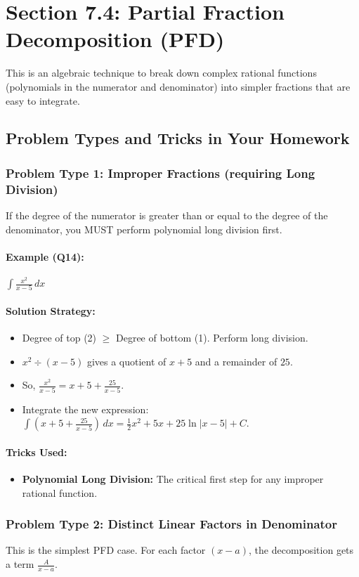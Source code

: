 \documentclass{article}
\begin{document}
\section{Section 7.4: Partial Fraction Decomposition (PFD)}
This is an algebraic technique to break down complex rational functions (polynomials in the numerator and denominator) into simpler fractions that are easy to integrate.

\subsection{Problem Types and Tricks in Your Homework}
\subsubsection{Problem Type 1: Improper Fractions (requiring Long Division)}
If the degree of the numerator is greater than or equal to the degree of the denominator, you MUST perform polynomial long division first.
\paragraph{Example (Q14):} $ \int \frac{x^2}{x-5} \,dx $
\paragraph{Solution Strategy:}
\begin{itemize}
    \item Degree of top (2) $\ge$ Degree of bottom (1). Perform long division.
    \item $x^2 \div (x-5)$ gives a quotient of $x+5$ and a remainder of $25$.
    \item So, $\frac{x^2}{x-5} = x+5 + \frac{25}{x-5}$.
    \item Integrate the new expression: $\int (x+5 + \frac{25}{x-5}) \,dx = \frac{1}{2}x^2 + 5x + 25\ln|x-5| + C$.
\end{itemize}
\paragraph{Tricks Used:}
\begin{itemize}
    \item \textbf{Polynomial Long Division:} The critical first step for any improper rational function.
\end{itemize}

\subsubsection{Problem Type 2: Distinct Linear Factors in Denominator}
This is the simplest PFD case. For each factor $(x-a)$, the decomposition gets a term $\frac{A}{x-a}$.
\end{document}
